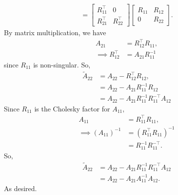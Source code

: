 \documentclass{report}
\begin{document}
\begin{remark}
\begin{align*}
        =
        \begin{bmatrix}
            R_{11}^{\top} & 0 \\
            R_{21}^{\top} & R_{22}^{\top}
        \end{bmatrix}
        \begin{bmatrix}
            R_{11} & R_{12} \\
            0 & R_{22}
        \end{bmatrix}
    .\end{align*}
    By  matrix multiplication, we have
    \begin{align*}
        A_{21} &= R_{12}^{\top}R_{11}, \\
        \implies R_{12}^{\top} &= A_{21}R_{11}^{-1}
    \end{align*}
    since $R_{11}$ is non-singular. So,
    \begin{align*}
        \tilde{A}_{22} &= A_{22} - R_{12}^{\top}R_{12}, \\
                       &= A_{22} - A_{21}R_{11}^{-1}R_{12} \\
                       &= A_{22} - A_{21}R_{11}^{-1}R_{11}^{-\top}A_{12}
    \end{align*}
    Since $R_{11}$ is the Cholesky factor for $A_{11}$, 
    \begin{align*}
        A_{11} &= R_{11}^{\top}R_{11}, \\
        \implies (A_{11})^{-1} &= (R_{11}^{\top}R_{11})^{-1} \\
                               &= R_{11}^{-1}R_{11}^{-\top}
    .\end{align*}
    So,
    \begin{align*}
        \tilde{A}_{22} &= A_{22} - A_{21}R_{11}^{-1}R_{11}^{-\top}A_{12} \\
                       &= A_{22} - A_{21}A_{11}^{-1}A_{12}
    .\end{align*}
    As desired.




\end{remark}
\end{document}
